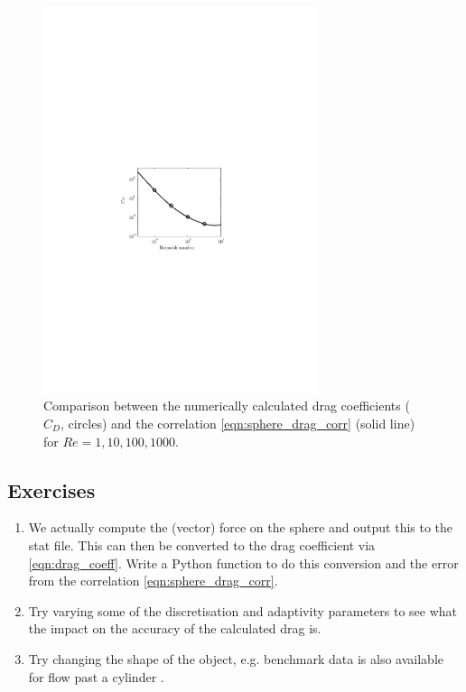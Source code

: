 \begin{figure}
\centering
\includegraphics[width=8cm,clip]{examples_images/flow_past_sphere/Sphere_Drag.pdf}
\caption{Comparison between the numerically calculated drag coefficients ($C_D$, circles) and the correlation \eqref{eqn:sphere_drag_corr} (solid line)
for $Re=1,10,100,1000$.}
\label{fig:flow_past_sphere_3}
\end{figure}



\subsection{Exercises}
\begin{enumerate}
\item We actually compute the (vector) force on the sphere and output this to the stat file. This can then be converted to the drag coefficient 
via \eqref{eqn:drag_coeff}. Write a Python function to do this conversion and the error from the correlation \eqref{eqn:sphere_drag_corr}.
\item Try varying some of the discretisation and adaptivity parameters to see what the impact on the accuracy of the
calculated drag is.
\item Try changing the shape of the object, e.g. benchmark data is also available for flow past a cylinder \citep{schafer1996}.
\end{enumerate}



